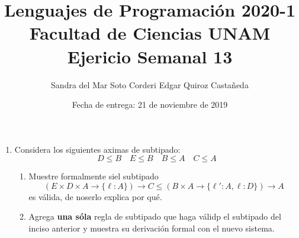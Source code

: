 \documentclass{article}
\title{
    Lenguajes de Programación 2020-1\\
    Facultad de Ciencias UNAM\\
    Ejericio Semanal 13
}
\author{
    Sandra del Mar Soto Corderi \qquad
    Edgar Quiroz Castañeda
}
\date{
    Fecha de entrega: 21 de noviembre de 2019
}
\newcommand{\x}{\times}
\newcommand{\m}{\rightarrow}
\begin{document}
    \maketitle

    \begin{enumerate}
        \item Considera los siguientes aximas de subtipado:
        \[D \leq B \quad E \leq B \quad B \leq A \quad C \leq A\]

        \begin{enumerate}
            \item Muestre formalmente siel subtipado
            \[
                (E \x D \x A \m \{\ell:A\}) \m C \leq 
                (B \x A \m \{\ell':A, \ell:D\}) \m A
            \]
            es válida, de noserlo explica por qué.

            \item Agrega \textbf{una sóla} regla de subtipado que haga válidp el
            subtipado del inciso anterior y muestra su derivación formal con el 
            nuevo sistema.
        \end{enumerate}
    \end{enumerate}
\end{document}

